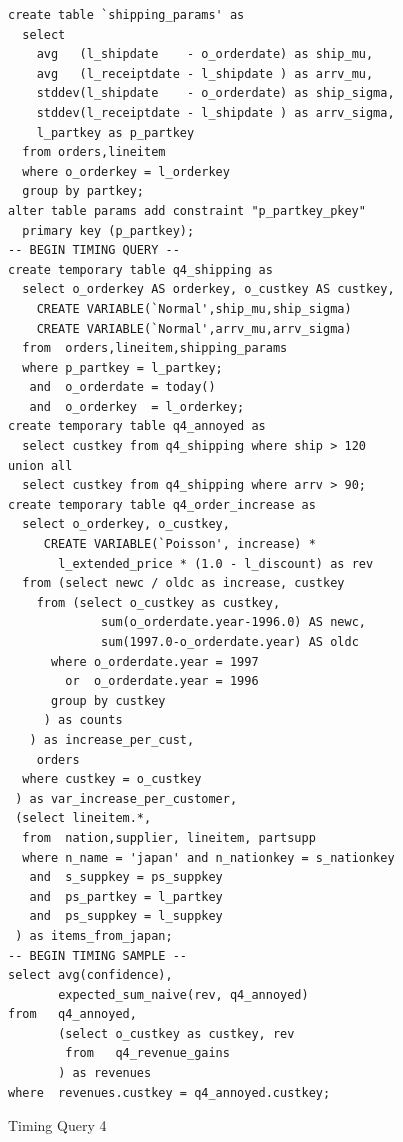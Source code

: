 \begin{figure}[t!]
\begin{footnotesize}
\begin{verbatim}
create table `shipping_params' as
  select 
    avg   (l_shipdate    - o_orderdate) as ship_mu,
    avg   (l_receiptdate - l_shipdate ) as arrv_mu,
    stddev(l_shipdate    - o_orderdate) as ship_sigma,
    stddev(l_receiptdate - l_shipdate ) as arrv_sigma,
    l_partkey as p_partkey
  from orders,lineitem
  where o_orderkey = l_orderkey
  group by partkey;
alter table params add constraint "p_partkey_pkey" 
  primary key (p_partkey);
-- BEGIN TIMING QUERY --
create temporary table q4_shipping as
  select o_orderkey AS orderkey, o_custkey AS custkey,
    CREATE VARIABLE(`Normal',ship_mu,ship_sigma)
    CREATE VARIABLE(`Normal',arrv_mu,arrv_sigma)
  from  orders,lineitem,shipping_params
  where p_partkey = l_partkey;
   and  o_orderdate = today()
   and  o_orderkey  = l_orderkey;
create temporary table q4_annoyed as
  select custkey from q4_shipping where ship > 120
union all
  select custkey from q4_shipping where arrv > 90;
create temporary table q4_order_increase as
  select o_orderkey, o_custkey,
     CREATE VARIABLE(`Poisson', increase) *
       l_extended_price * (1.0 - l_discount) as rev
  from (select newc / oldc as increase, custkey 
    from (select o_custkey as custkey, 
             sum(o_orderdate.year-1996.0) AS newc,
             sum(1997.0-o_orderdate.year) AS oldc
      where o_orderdate.year = 1997 
        or  o_orderdate.year = 1996
      group by custkey
     ) as counts
   ) as increase_per_cust,
    orders
  where custkey = o_custkey
 ) as var_increase_per_customer,
 (select lineitem.*,
  from  nation,supplier, lineitem, partsupp
  where n_name = 'japan' and n_nationkey = s_nationkey
   and  s_suppkey = ps_suppkey
   and  ps_partkey = l_partkey
   and  ps_suppkey = l_suppkey
 ) as items_from_japan;
-- BEGIN TIMING SAMPLE --
select avg(confidence),
       expected_sum_naive(rev, q4_annoyed)
from   q4_annoyed,
       (select o_custkey as custkey, rev
        from   q4_revenue_gains
       ) as revenues
where  revenues.custkey = q4_annoyed.custkey;
\end{verbatim}
\end{footnotesize}

\vspace{-5mm}

\caption{Timing Query 4}
\label{fig:timingq4}
\end{figure}